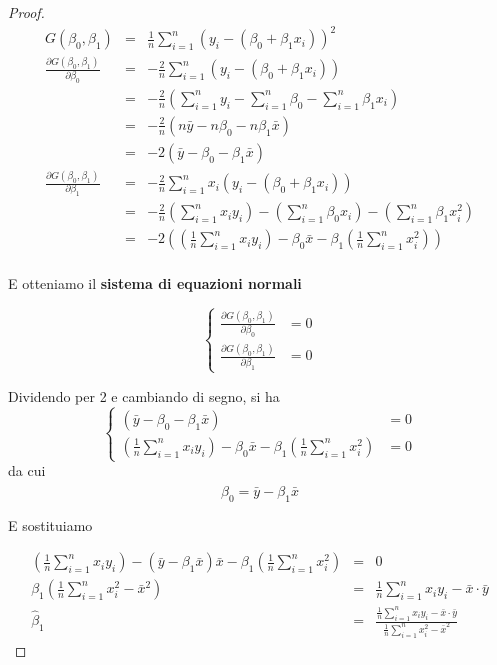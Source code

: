 \documentclass[
  11pt,
]{book}
\theoremstyle{mytheoremstyle}
\theoremstyle{mydefstyle}
\begin{document}
\begin{proof}
\begin{eqnarray*}
  G(\beta_{0}, \beta_{1}) &=& \frac 1n \sum_{i=1}^{n} \left( y_{i} - (\beta_{0} + \beta_{1} x_{i})   \right)^2\\ 
  \frac{\partial G(\beta_{0}, \beta_{1})} {\partial \beta_{0}} 
&=& -\frac{2} {n} \sum_{i=1}^n  \left( y_{i} - (\beta_{0} + \beta_{1} x_{i})
    \right)\\
&=& -\frac{2} n\left(\sum_{i=1}^ny_i-\sum_{i=1}^n\beta_0-\sum_{i=1}^n\beta_1 x_i\right) \\
&=&-\frac{2} n\left(n\bar y-n\beta_0-n\beta_1\bar x\right) \\
&=&-2\left(\bar y-\beta_0-\beta_1\bar x\right) \\
    \frac{\partial G(\beta_{0}, \beta_{1})}  {\partial \beta_{1}}
&=& -\frac{2} {n} \sum_{i=1}^n  x_i\left( y_{i} - (\beta_{0} + \beta_{1} x_{i})
    \right)\\
&=& -\frac{2} {n} \left(\sum_{i=1}^n  x_i y_{i}\right) - \left(\sum_{i=1}^n\beta_{0}x_i\right) 
- \left(\sum_{i=1}^n\beta_{1} x_{i}^2\right)\\
&=& -2 \left(\left(\frac 1n\sum_{i=1}^n  x_i y_{i}\right) - \beta_{0}\bar x
- \beta_{1}\left(\frac 1n\sum_{i=1}^n x^2_{i}\right)\right)\\
\end{eqnarray*}

E otteniamo il \textbf{sistema di equazioni normali}

\[
\left\{
\begin{array}{rl} 
 \frac{\partial G(\beta_{0}, \beta_{1})} {\partial \beta_{0}} &= 0  \\
  \frac{\partial G(\beta_{0}, \beta_{1})} {\partial \beta_{1}} &= 0
\end{array}\right.
\]

Dividendo per 2 e cambiando di segno, si ha
\[
\left\{
\begin{array}{rl} 
\left(\bar y-\beta_0-\beta_1\bar x\right)  &= 0\\
\left(\frac 1n\sum_{i=1}^n  x_i y_{i}\right) - \beta_{0}\bar x
- \beta_{1}\left(\frac 1n\sum_{i=1}^n x^2_{i}\right) &= 0
\end{array}\right.
\]
da cui
\[
    \hat\beta_0 = \bar y- \beta_{1} \bar{x}                  
\]

E sostituiamo

\begin{eqnarray*}
\left(\frac 1n\sum_{i=1}^n  x_i y_{i}\right) - (\bar y - \beta_1\bar x)\bar x
- \beta_{1}\left(\frac 1n\sum_{i=1}^n x^2_{i}\right) &=& 0\\
\beta_1\left(\frac 1n\sum_{i=1}^n x^2_{i}-\bar x^2\right) &=&
\frac 1n\sum_{i=1}^n x_i y_{i} - \bar x\cdot\bar y\\
\hat\beta_1 &=& \frac{\frac 1n\sum_{i=1}^n x_i y_{i} - \bar x\cdot\bar y}{\frac 1n\sum_{i=1}^n x^2_{i}-\bar x^2}
\end{eqnarray*}


\end{proof}
\end{document}
